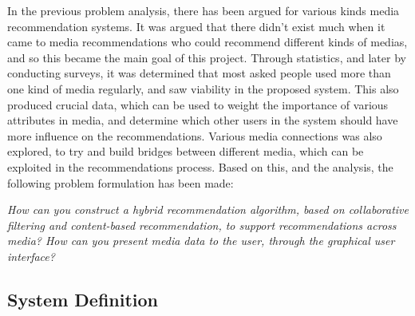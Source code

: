 In the previous problem analysis, there has been argued for various kinds media recommendation systems. It was argued that there didn’t exist much when it came to media recommendations who could recommend different kinds of medias, and so this became the main goal of this project. Through statistics, and later by conducting surveys, it was determined that most asked people used more than one kind of media regularly, and saw viability in the proposed system. This also produced crucial data, which can be used to weight the importance of various attributes in media, and determine which other users in the system should have more influence on the recommendations. Various media connections was also explored, to try and build bridges between different media, which can be exploited in the recommendations process. Based on this, and the analysis, the following problem formulation has been made:

\textit{How can you construct a hybrid recommendation algorithm, based on collaborative filtering and content-based recommendation, to support recommendations across media? How can you present media data to the user, through the graphical user interface?}

\subsection{System Definition}
\label{SysDefinition}
